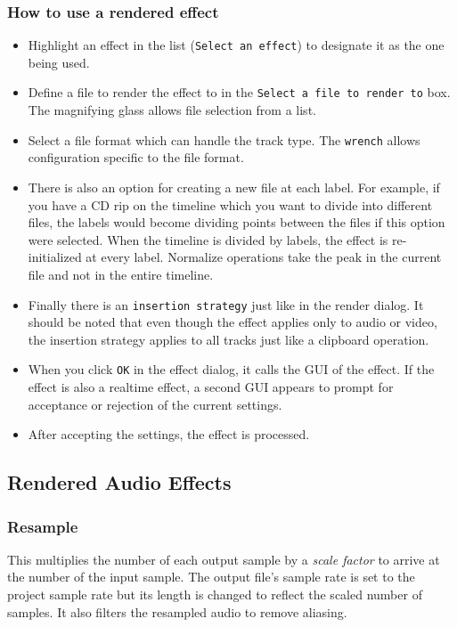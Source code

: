\subsubsection*{How to use a rendered effect}%
\label{ssub:how_use_rendered_effect}

\begin{itemize}
    \item Highlight an effect in the list (\texttt{Select an effect}) to designate it as the one being used.
    \item Define a file to render the effect to in the \texttt{Select a file to render to} box. The magnifying glass allows file selection from a list.
    \item Select a file format which can handle the track type. The \texttt{wrench} allows configuration specific to the file format.
    \item There is also an option for creating a new file at each label. For example, if you have a CD rip on the timeline which you want to divide into different files, the labels would become dividing points between the files if this option were selected. When the timeline is divided by labels, the effect is re-initialized at every label. Normalize operations take the peak in the current file and not in the entire timeline.
    \item Finally there is an \texttt{insertion strategy} just like in the render dialog. It should be noted that even though the effect applies only to audio or video, the insertion strategy applies to all tracks just like a clipboard operation.
    \item When you click \texttt{OK} in the effect dialog, it calls the GUI of the effect. If the effect is also a realtime effect, a second GUI appears to prompt for acceptance or rejection of the current settings.
    \item After accepting the settings, the effect is processed.
\end{itemize}

\subsection{Rendered Audio Effects}%
\label{sub:renederd_audio_effets}

\subsubsection*{Resample}%
\label{ssub:resample}

This multiplies the number of each output sample by a \textit{scale factor} to arrive at the number of the input sample. The output file's sample rate is set to the project sample rate but its length is changed to reflect the scaled number of samples. It also filters the resampled audio to remove aliasing.


